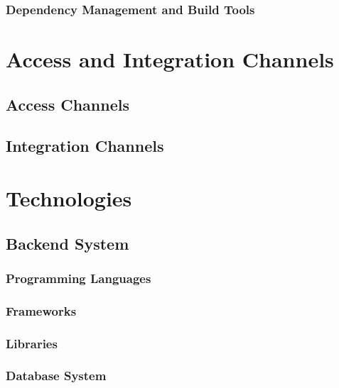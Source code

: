 \documentclass[11pt,fleqn]{book} %
\begin{document}
		\subsection{Dependency Management and Build Tools}	
	
	


\chapter{Access and Integration Channels}

	\section{Access Channels}
	\section{Integration Channels}
	
	


\chapter{Technologies}

	\section{Backend System}
		\subsection{Programming Languages}
		\subsection{Frameworks}
		\subsection{Libraries}
		\subsection{Database System}
\end{document}
